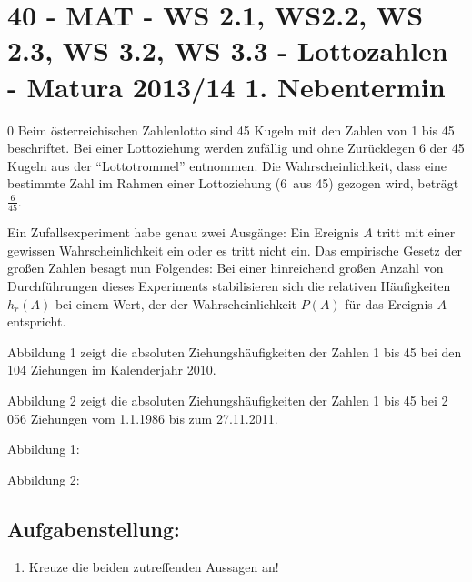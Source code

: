 \section{40 - MAT - WS 2.1, WS2.2, WS 2.3, WS 3.2, WS 3.3  - Lottozahlen - Matura 2013/14 1. Nebentermin}

\begin{langesbeispiel} \item[0] %
				Beim österreichischen Zahlenlotto sind 45 Kugeln mit den Zahlen von 1 bis 45 beschriftet. Bei einer Lottoziehung werden zufällig und ohne Zurücklegen 6 der 45 Kugeln aus der "`Lottotrommel"' entnommen. Die Wahrscheinlichkeit, dass eine bestimmte Zahl im Rahmen einer Lottoziehung (6 aus 45) gezogen wird, beträgt $\frac{6}{45}$.
				
				Ein Zufallsexperiment habe genau zwei Ausgänge: Ein Ereignis $A$ tritt mit einer gewissen Wahrscheinlichkeit ein oder es tritt nicht ein. Das empirische Gesetz der großen Zahlen besagt nun Folgendes: Bei einer hinreichend großen Anzahl von Durchführungen dieses Experiments stabilisieren sich die relativen Häufigkeiten $h_r(A)$ bei einem Wert, der der Wahrscheinlichkeit $P(A)$ für das Ereignis $A$ entspricht.

Abbildung 1 zeigt die absoluten Ziehungshäufigkeiten der Zahlen 1 bis 45 bei den 104 Ziehungen im Kalenderjahr 2010. 

Abbildung 2 zeigt die absoluten Ziehungshäufigkeiten der Zahlen 1 bis 45 bei 2 056 Ziehungen vom 1.1.1986 bis zum 27.11.2011.

Abbildung 1:
				\begin{center}\end{center}
				
Abbildung 2:
\begin{center}\end{center}

\subsection{Aufgabenstellung:}
\begin{enumerate}
	\item {} Kreuze die beiden zutreffenden Aussagen an!
	

\end{enumerate}
\end{langesbeispiel}
